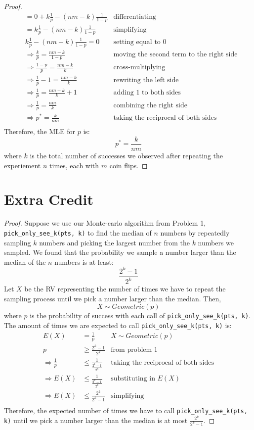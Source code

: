 \documentclass[11pt]{article}
\begin{document}
\begin{proof}
\begin{align*}
		&= 0 + k \frac{1}{p} - (nm - k) \frac{1}{1 - p} & \text{differentiating} \\
		&= k \frac{1}{p} - (nm - k) \frac{1}{1 - p} & \text{simplifying} \\
		& k \frac{1}{p} - (nm - k) \frac{1}{1 - p} = 0 & \text{setting equal to } 0 \\
		&\Rightarrow \frac{k}{p} = \frac{nm - k}{1 - p} & \text{moving the second term to the right side} \\
		&\Rightarrow \frac{1 - p}{p} = \frac{nm - k}{k} & \text{cross-multiplying} \\
		&\Rightarrow \frac{1}{p} - 1 = \frac{nm - k}{k} & \text{rewriting the left side} \\
		&\Rightarrow \frac{1}{p} = \frac{nm - k}{k} + 1 & \text{adding } 1 \text{ to both sides} \\
		&\Rightarrow \frac{1}{p} = \frac{nm}{k} & \text{combining the right side} \\
		&\Rightarrow p^* = \frac{k}{nm} & \text{taking the reciprocal of both sides} \\
	\end{align*}
	Therefore, the MLE for $p$ is:
	\[
		p^* = \frac{k}{nm}
	\]
	where $k$ is the total number of successes we observed after repeating the experiement $n$ times, each with $m$ coin flips.
\end{proof}

\newpage

\section*{Extra Credit}
\begin{proof}
	Suppose we use our Monte-carlo algorithm from Problem 1, \texttt{pick\_only\_see\_k(pts, k)} to find the median of $n$ numbers by repeatedly sampling $k$ numbers and picking the largest number from the $k$ numbers we sampled. 
	We found that the probability we sample a number larger than the median of the $n$ numbers is at least:
	\[
		\frac{2^k - 1}{2^k}
	\]
	Let $X$ be the RV representing the number of times we have to repeat the sampling process until we pick a number larger than the median. 
	Then,
	\[
		X \sim Geometric(p)
	\]
	where $p$ is the probability of success with each call of \texttt{pick\_only\_see\_k(pts, k)}.
	The amount of times we are expected to call \texttt{pick\_only\_see\_k(pts, k)} is:
	\begin{align*}
		E(X) &= \frac{1}{p} & X \sim Geometric(p) \\
		p &\geq \frac{2^k - 1}{2^k} & \text{from problem 1} \\
		\Rightarrow \frac{1}{p} &\leq \frac{1}{\frac{2^k - 1}{2^k}} & \text{taking the reciprocal of both sides} \\
		\Rightarrow E(X) &\leq \frac{1}{\frac{2^k - 1}{2^k}} & \text{substituting in } E(X) \\
		\Rightarrow E(X) &\leq \frac{2^k}{2^k - 1} & \text{simplifying} \\
	\end{align*}
	Therefore, the expected number of times we have to call \texttt{pick\_only\_see\_k(pts, k)} until we pick a number larger than the median is at most $\frac{2^k}{2^k - 1}$.
\end{proof}
\end{document}
